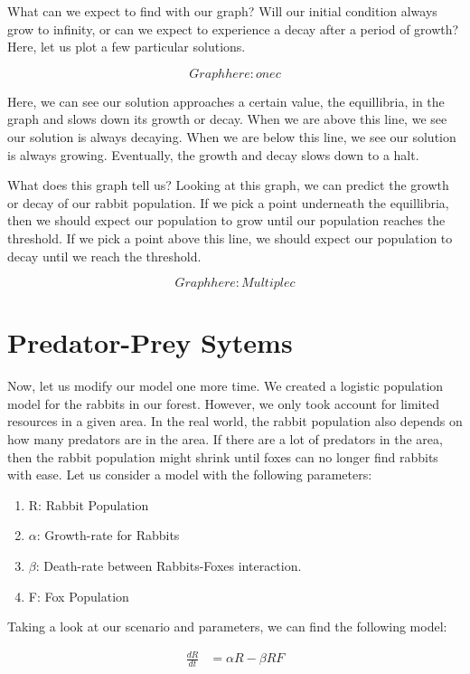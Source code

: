 \documentclass{amsart}
\theoremstyle{definition}
\numberwithin{equation}{section}
\begin{document}
\begin{sansmath}
What can we expect to find with our graph? Will our initial condition always grow to infinity, or can we expect to experience a decay after a period of growth? Here, let us plot a few particular solutions. %

\[ Graph here: one c \]

Here, we can see our solution approaches a certain value, the equillibria, in the graph and slows down its growth or decay. When we are above this line, we see our solution is always decaying. When we are below this line, we see our solution is always growing. Eventually, the growth and decay slows down to a halt.

What does this graph tell us? Looking at this graph, we can predict the growth or decay of our rabbit population. If we pick a point underneath the equillibria, then we should expect our population to grow until our population reaches the threshold. If we pick a point above this line, we should expect our population to decay until we reach the threshold.

\[ Graph here: Multiple c \]

\section{Predator-Prey Sytems}

Now, let us modify our model one more time. We created a logistic population model for the rabbits in our forest. However, we only took account for limited resources in a given area. In the real world, the rabbit population also depends on how many predators are in the area. If there are a lot of predators in the area, then the rabbit population might shrink until foxes can no longer find rabbits with ease. Let us consider a model with the following parameters:
\begin{enumerate}
  \item R: Rabbit Population
  \item $\alpha$: Growth-rate for Rabbits
  \item $\beta$: Death-rate between Rabbits-Foxes interaction.
  \item F: Fox Population
\end{enumerate}

Taking a look at our scenario and parameters, we can find the following model:

\begin{align*}
  \frac{dR}{dt} & = \alpha R - \beta RF
\end{align*}


\end{sansmath}
\end{document}
